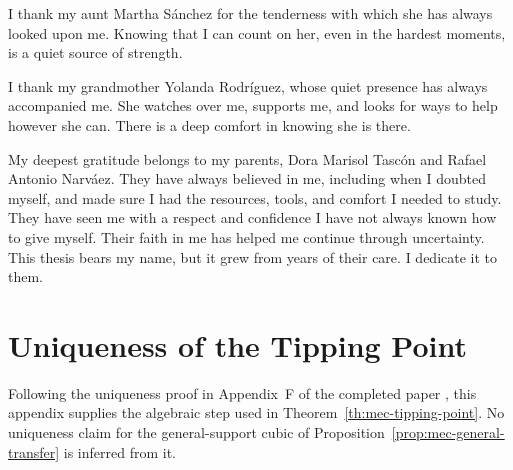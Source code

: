 \documentclass{article}
\theoremstyle{plain}
\theoremstyle{remark}
\begin{document}
I thank my aunt Martha Sánchez for the tenderness with which she has always looked upon me. Knowing that I can count on her, even in the hardest moments, is a quiet source of strength.

I thank my grandmother Yolanda Rodríguez, whose quiet presence has always accompanied me. She watches over me, supports me, and looks for ways to help however she can. There is a deep comfort in knowing she is there.

My deepest gratitude belongs to my parents, Dora Marisol Tascón and Rafael Antonio Narváez. They have always believed in me, including when I doubted myself, and made sure I had the resources, tools, and comfort I needed to study. They have seen me with a respect and confidence I have not always known how to give myself. Their faith in me has helped me continue through uncertainty. This thesis bears my name, but it grew from years of their care. I dedicate it to them.

\clearpage
\appendix
\section{Uniqueness of the Tipping Point}\label{app:mec-tipping-uniqueness}

Following the uniqueness proof in Appendix~F of the completed paper \citep{aranda2026mec}, this appendix supplies the algebraic step used in Theorem~\ref{th:mec-tipping-point}. No uniqueness claim for the general-support cubic of Proposition~\ref{prop:mec-general-transfer} is inferred from it.
\end{document}
